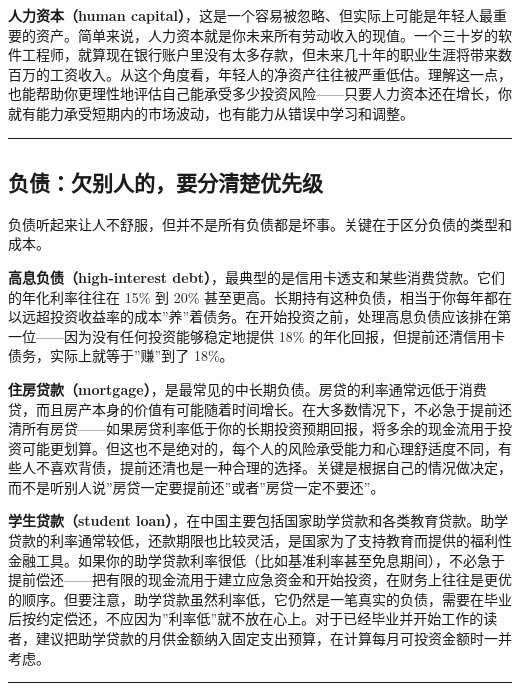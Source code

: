 \documentclass[a4paper,11pt,oneside,fontset=none,UTF8,zihao=-4]{ctexbook}
\begin{document}
\textbf{人力资本（human
capital）}，这是一个容易被忽略、但实际上可能是年轻人最重要的资产。简单来说，人力资本就是你未来所有劳动收入的现值。一个三十岁的软件工程师，就算现在银行账户里没有太多存款，但未来几十年的职业生涯将带来数百万的工资收入。从这个角度看，年轻人的净资产往往被严重低估。理解这一点，也能帮助你更理性地评估自己能承受多少投资风险------只要人力资本还在增长，你就有能力承受短期内的市场波动，也有能力从错误中学习和调整。

\begin{center}{\color{dh-bronze}\rule{0.2\textwidth}{0.5pt}}\end{center}

\subsection{负债：欠别人的，要分清楚优先级}\label{ux8d1fux503aux6b20ux522bux4ebaux7684ux8981ux5206ux6e05ux695aux4f18ux5148ux7ea7}

负债听起来让人不舒服，但并不是所有负债都是坏事。关键在于区分负债的类型和成本。

\textbf{高息负债（high-interest
debt）}，最典型的是信用卡透支和某些消费贷款。它们的年化利率往往在 15\%
到 20\%
甚至更高。长期持有这种负债，相当于你每年都在以远超投资收益率的成本''养''着债务。在开始投资之前，处理高息负债应该排在第一位------因为没有任何投资能够稳定地提供
18\% 的年化回报，但提前还清信用卡债务，实际上就等于''赚''到了 18\%。

\textbf{住房贷款（mortgage）}，是最常见的中长期负债。房贷的利率通常远低于消费贷，而且房产本身的价值有可能随着时间增长。在大多数情况下，不必急于提前还清所有房贷------如果房贷利率低于你的长期投资预期回报，将多余的现金流用于投资可能更划算。但这也不是绝对的，每个人的风险承受能力和心理舒适度不同，有些人不喜欢背债，提前还清也是一种合理的选择。关键是根据自己的情况做决定，而不是听别人说''房贷一定要提前还''或者''房贷一定不要还''。

\textbf{学生贷款（student
loan）}，在中国主要包括国家助学贷款和各类教育贷款。助学贷款的利率通常较低，还款期限也比较灵活，是国家为了支持教育而提供的福利性金融工具。如果你的助学贷款利率很低（比如基准利率甚至免息期间），不必急于提前偿还------把有限的现金流用于建立应急资金和开始投资，在财务上往往是更优的顺序。但要注意，助学贷款虽然利率低，它仍然是一笔真实的负债，需要在毕业后按约定偿还，不应因为''利率低''就不放在心上。对于已经毕业并开始工作的读者，建议把助学贷款的月供金额纳入固定支出预算，在计算每月可投资金额时一并考虑。

\begin{center}{\color{dh-bronze}\rule{0.2\textwidth}{0.5pt}}\end{center}
\end{document}
